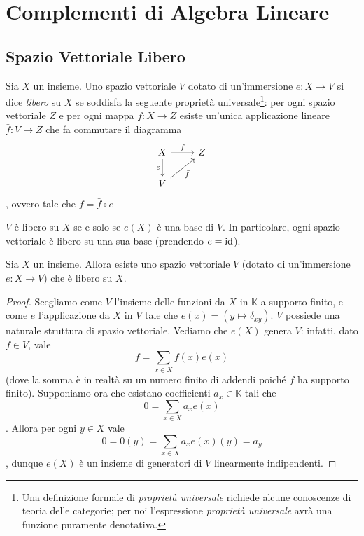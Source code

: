 \chapter{Complementi di Algebra Lineare}

\section{Spazio Vettoriale Libero}

\begin{definition}
Sia $X$ un insieme. Uno spazio vettoriale $V$ dotato di un'immersione $e:X\to V$ si dice \emph{libero} su $X$ se soddisfa la seguente proprietà universale\footnote{Una definizione formale di \emph{proprietà universale} richiede alcune conoscenze di teoria delle categorie; per noi l'espressione \emph{proprietà universale} avrà una funzione puramente denotativa.}: per ogni spazio vettoriale $Z$ e per ogni mappa $f:X\to Z$ esiste un'unica applicazione lineare $\bar{f}:V\to Z$ che fa commutare il diagramma
$$
\begin{tikzcd}
X\arrow[r,"f"]\arrow[d,"e",swap]&Z\\
V\arrow[ru,"\bar{f}",swap]
\end{tikzcd}
$$
, ovvero tale che $f=\bar{f}\circ e$
\end{definition}

\begin{remark}
$V$ è libero su $X$ se e solo se $e(X)$ è una base di $V$. In particolare, ogni spazio vettoriale è libero su una sua base (prendendo $e=\operatorname{id}$).
\end{remark}

\begin{proposition}
Sia $X$ un insieme. Allora esiste uno spazio vettoriale $V$ (dotato di un'immersione $e:X\to V$) che è libero su $X$.
\end{proposition}
\begin{proof}
Scegliamo come $V$ l'insieme delle funzioni da $X$ in $\mathbb{K}$ a supporto finito, e come $e$ l'applicazione da $X$ in $V$ tale che $e(x)=(y\mapsto\delta_{xy})$. $V$ possiede una naturale struttura di spazio vettoriale. Vediamo che $e(X)$ genera $V$: infatti, dato $f\in V$, vale
$$
f=\sum_{x\in X}f(x)e(x)
$$
(dove la somma è in realtà su un numero finito di addendi poiché $f$ ha supporto finito). Supponiamo ora che esistano coefficienti $a_x\in\mathbb{K}$ tali che
$$
0=\sum_{x\in X}a_xe(x)
$$
. Allora per ogni $y\in X$ vale
$$
0=0(y)=\sum_{x\in X}a_xe(x)(y)=a_y
$$
, dunque $e(X)$ è un insieme di generatori di $V$ linearmente indipendenti.
\end{proof}

